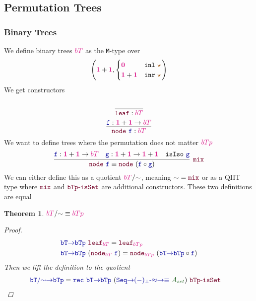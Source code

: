 \documentclass[twoside,11pt,openright]{report}
\theoremstyle{plain} %
\newtheorem{thm}{Theorem}[section]
\theoremstyle{definition}
\theoremstyle{remark}
\newcommand*{\term}[1]{\textcolor{green!30!black}{#1}} %
\newcommand*{\type}[1]{\textcolor{magenta!90!black}{#1}}
\newcommand*{\unit}{\type{\textbf{1}}}
\newcommand*{\empt}{\type{\textbf{0}}}
\newcommand*{\relation}[1]{\textcolor{gray!75!black}{\ensuremath{\mathtt{#1}}}}
\newcommand*{\constant}[1]{\textcolor{orange!60!black}{\ensuremath{\mathtt{#1}}}}
\newcommand*{\function}[1]{\textcolor{blue!60!black}{\ensuremath{\mathtt{#1}}}}
\newcommand*{\constructor}[1]{\textcolor{purple!60!black}{\ensuremath{\mathtt{#1}}}}
\newcommand*{\unitelem}{\constant{\star}} %
\begin{document}
\subsection{Permutation Trees}
\subsubsection{Binary Trees}
We define binary trees \(\type{bT}\) as the \texttt{M}-type over
\begin{equation}
  \left(\unit+\unit, \begin{cases} \empt & \mathtt{inl}~\unitelem\\ \unit + \unit & \mathtt{inr}~\unitelem \end{cases}\right)
\end{equation}
We get constructors
\begin{equation}
  \vcenter{\infer{\constructor{leaf} : \type{bT}}{\strut}}
\end{equation}
\begin{equation}
  \vcenter{\infer{\constructor{node}~\function{f} : \type{bT}}{\function{f} : \unit + \unit \rightarrow \type{bT}}}
\end{equation}
We want to define trees where the permutation does not matter \(\type{bTp}\)
\begin{equation}
  \vcenter{\infer[\constructor{mix}]{\constructor{node}~\function{f} \equiv \constructor{node}~(\function{f} \circ \function{g})}{\function{f} : \unit + \unit \rightarrow \type{bT} & \function{g} : \unit + \unit \rightarrow \unit + \unit & \mathtt{isIso}~\function{g}}}
\end{equation}
We can either define this as a quotient \(\type{bT} / \relation{\sim}\), meaning \(\relation{\sim} = \constructor{mix}\) or as a QIIT type where \(\constructor{mix}\) and \(\constructor{bTp\text{-}isSet}\) are additional constructors. These two definitions are equal
\begin{thm}
  \(\type{bT}/\relation{\sim} \equiv \type{bTp}\)
  \begin{proof}
    \begin{equation}
      \begin{aligned}
        &\function{bT{\rightarrow}bTp}~\constructor{leaf}_{\type{bT}} = \constructor{leaf}_{\type{bTp}} \\
        &\function{bT{\rightarrow}bTp}~(\constructor{node}_{\type{bT}}~\function{f}) = \constructor{node}_{\type{bTp}}~(\function{bT{\rightarrow}bTp} \circ \function{f})
      \end{aligned}
    \end{equation}
    Then we lift the definition to the quotient
    \begin{equation}
      \begin{aligned}
        &\function{bT/{\sim}{\rightarrow}bTp} = \function{rec}~\function{bT{\rightarrow}bTp}~(\function{Seq{\rightarrow}(-)_\bot\text{-}{\approx}{\rightarrow}{\equiv}}~\term{A_{set}})~\constructor{bTp\text{-}isSet}
      \end{aligned}
    \end{equation}
  \end{proof}
\end{thm}
\end{document}
